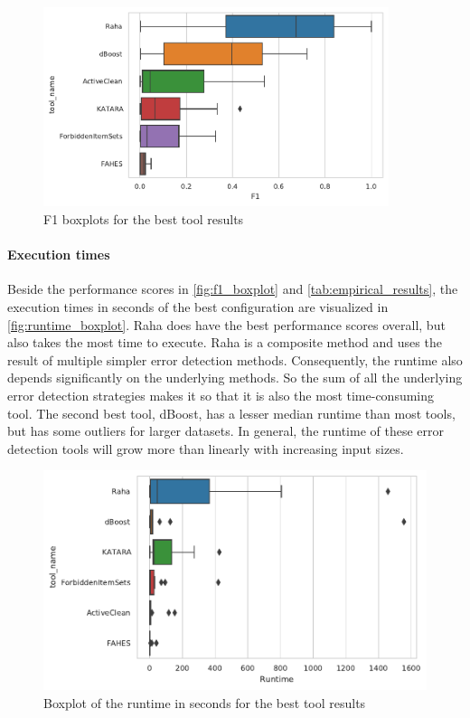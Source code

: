 \begin{figure}
\centering
\includegraphics[width=0.9\textwidth]{Figures/RQ1/F1Boxplot.pdf}
\caption{F1 boxplots for the best tool results}
\label{fig:f1_boxplot}
\end{figure}

\paragraph{Execution times} 
Beside the performance scores in \autoref{fig:f1_boxplot} and \autoref{tab:empirical_results}, the execution times in seconds of the best configuration are visualized in \autoref{fig:runtime_boxplot}. Raha does have the best performance scores overall, but also takes the most time to execute. Raha is a composite method and uses the result of multiple simpler error detection methods. Consequently, the runtime also depends significantly on the underlying methods. So the sum of all the underlying error detection strategies makes it so that it is also the most time-consuming tool. The second best tool, dBoost, has a lesser median runtime than most tools, but has some outliers for larger datasets. In general, the runtime of these error detection tools will grow more than linearly with increasing input sizes.

\begin{figure}
    \centering
    \begin{adjustbox}{center}
    \includegraphics[width=\linewidth]{thesis/Figures/RQ1/RuntimeBoxplot.pdf}
    \end{adjustbox}
    \caption{Boxplot of the runtime in seconds for the best tool results}
    \label{fig:runtime_boxplot}
\end{figure}


